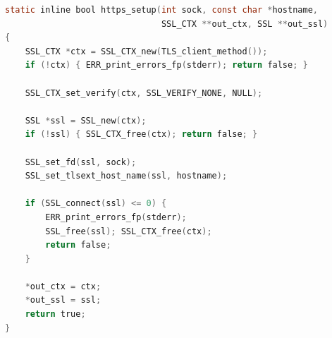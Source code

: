 \begin{lstlisting}[style=newcode,language=C,firstnumber=last]
static inline bool https_setup(int sock, const char *hostname,
                               SSL_CTX **out_ctx, SSL **out_ssl)
{
    SSL_CTX *ctx = SSL_CTX_new(TLS_client_method());
    if (!ctx) { ERR_print_errors_fp(stderr); return false; }

    SSL_CTX_set_verify(ctx, SSL_VERIFY_NONE, NULL);

    SSL *ssl = SSL_new(ctx);
    if (!ssl) { SSL_CTX_free(ctx); return false; }

    SSL_set_fd(ssl, sock);
    SSL_set_tlsext_host_name(ssl, hostname);

    if (SSL_connect(ssl) <= 0) {
        ERR_print_errors_fp(stderr);
        SSL_free(ssl); SSL_CTX_free(ctx);
        return false;
    }

    *out_ctx = ctx;
    *out_ssl = ssl;
    return true;
}
\end{lstlisting}

